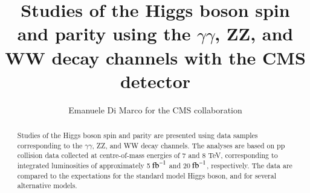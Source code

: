 \documentclass[3p,times,twocolumn]{elsarticle}
\begin{document}
\begin{frontmatter}



\dochead{}

\title{Studies of the Higgs boson spin and parity using the $\gamma\gamma$, ZZ, and WW decay channels with the CMS detector}


\author{Emanuele Di Marco for the CMS collaboration}

\address{CERN, CH-1211 Geneva 23, Switzerland}

\begin{abstract}
Studies of the Higgs boson spin and parity are presented using data
samples corresponding to the $\gamma\gamma$, ZZ, and WW decay
channels. The analyses are based on pp collision data collected at
centre-of-mass energies of 7 and 8 TeV, corresponding to integrated
luminosities of approximately 5$\,\mathrm{fb}^\mathrm{-1}$ and 20$\,\mathrm{fb}^\mathrm{-1}$,
respectively. The data are compared to the expectations for the
standard model Higgs boson, and for several alternative models.
\end{abstract}

\begin{keyword}
  

\end{keyword}

\end{frontmatter}
\end{document}

